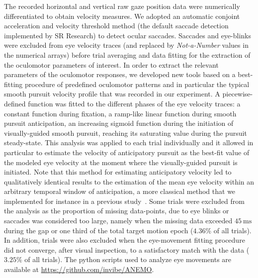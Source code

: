 \documentclass[10pt,letterpaper]{article}
\newcommand{\ms}{\si{\milli\second}}%
\begin{document}
The recorded horizontal and vertical raw gaze position data were numerically differentiated to obtain velocity measures. We adopted an automatic conjoint acceleration and velocity threshold method (the default saccade detection implemented by SR Research) to detect ocular saccades. Saccades and eye-blinks were excluded from eye velocity traces (and replaced by \textit{Not-a-Number} values in the numerical arrays) before trial averaging and data fitting for the extraction of the oculomotor parameters of interest.
In order to extract the relevant parameters of the oculomotor responses, we developed new tools based on a best-fitting procedure of predefined oculomotor patterns and in particular the typical smooth pursuit velocity profile that was recorded in our experiment. A piecewise-defined function was fitted to the different phases of the eye velocity traces: a constant function during fixation, a ramp-like linear function during smooth pursuit anticipation, an increasing sigmoid function during the initiation of visually-guided smooth pursuit, reaching its saturating value during the pursuit steady-state. This analysis was applied to each trial individually and it allowed in particular to estimate the velocity of anticipatory pursuit  as the best-fit value of the modeled eye velocity at the moment where the visually-guided pursuit is initiated. Note that this method for estimating anticipatory velocity led to qualitatively identical results to the estimation of the mean eye velocity within an arbitrary temporal window of anticipation, a more classical method that we implemented for instance in a previous study~\cite{Damasse18}.  Some trials were excluded from the analysis as the proportion of missing data-points, due to eye blinks or saccades was considered too large, namely when the missing data exceeded $45~\ms$ during the gap or one third of the total target motion epoch ($4.36\%$ of all trials). In addition, trials were also excluded when the eye-movement fitting procedure did not converge, after visual inspection, to a satisfactory match with the data ($3.25\%$ of all trials). The python scripts used to analyze eye movements are available at \url{https://github.com/invibe/ANEMO}.
\end{document}
